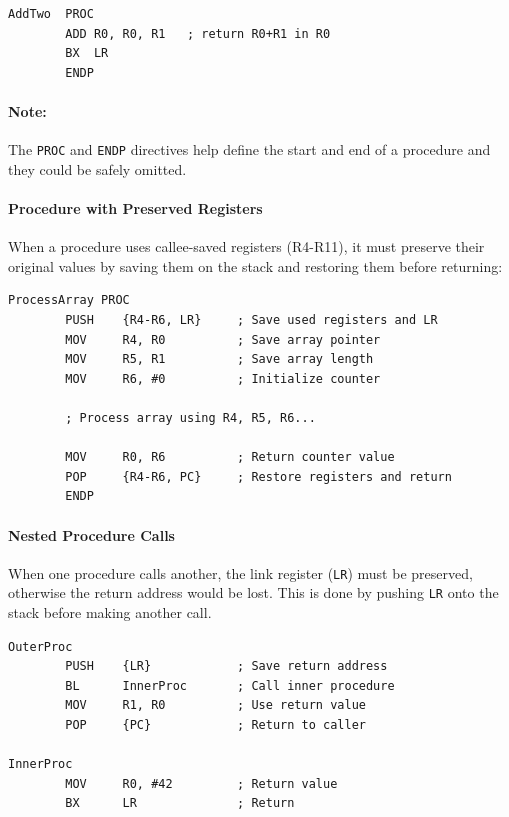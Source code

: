 \begin{lstlisting}[caption={Basic procedure structure}]
AddTwo  PROC
        ADD R0, R0, R1   ; return R0+R1 in R0
        BX  LR
        ENDP
\end{lstlisting}
\paragraph{Note:} The \texttt{PROC} and \texttt{ENDP} directives help define the start and end of a procedure and they could be safely omitted.

\paragraph{Procedure with Preserved Registers}

When a procedure uses callee-saved registers (R4-R11), it must preserve their original values by saving them on the stack and restoring them before returning:

\begin{lstlisting}[caption={Procedure using preserved registers}]
ProcessArray PROC
        PUSH    {R4-R6, LR}     ; Save used registers and LR
        MOV     R4, R0          ; Save array pointer
        MOV     R5, R1          ; Save array length  
        MOV     R6, #0          ; Initialize counter
        
        ; Process array using R4, R5, R6...
        
        MOV     R0, R6          ; Return counter value
        POP     {R4-R6, PC}     ; Restore registers and return
        ENDP
\end{lstlisting}

\paragraph{Nested Procedure Calls}

When one procedure calls another, the link register (\texttt{LR}) must be preserved, otherwise the return address would be lost. This is done by pushing \texttt{LR} onto the stack before making another call.

\begin{lstlisting}[caption={Nested procedure example}]
OuterProc
        PUSH    {LR}            ; Save return address
        BL      InnerProc       ; Call inner procedure
        MOV     R1, R0          ; Use return value
        POP     {PC}            ; Return to caller

InnerProc 
        MOV     R0, #42         ; Return value
        BX      LR              ; Return
\end{lstlisting}


